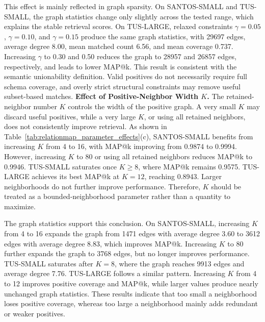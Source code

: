 This effect is mainly reflected in graph sparsity. On SANTOS-SMALL and
TUS-SMALL, the graph statistics change only slightly across the tested range,
which explains the stable retrieval scores. On TUS-LARGE, relaxed constraints
\(\gamma=0.05\), \(\gamma=0.10\), and \(\gamma=0.15\) produce the same graph
statistics, with 29697 edges, average degree 8.00, mean matched count 6.56,
and mean coverage 0.737. Increasing \(\gamma\) to 0.30 and 0.50 reduces the
graph to 28957 and 26857 edges, respectively, and leads to lower MAP@k. This
result is consistent with the semantic unionability definition. Valid
positives do not necessarily require full schema coverage, and overly strict
structural constraints may remove useful subset-based matches.
\textbf{Effect of Positive-Neighbor Width \(K\). }The retained-neighbor number \(K\) controls the width of the positive graph. A
very small \(K\) may discard useful positives, while a very large \(K\), or
using all retained neighbors, does not consistently improve retrieval. As
shown in Table~\ref{tab:relationmap_parameter_effects}(c), SANTOS-SMALL benefits from
increasing \(K\) from 4 to 16, with MAP@k improving from 0.9874 to 0.9994.
However, increasing \(K\) to 80 or using all retained neighbors reduces MAP@k
to 0.9946. TUS-SMALL saturates once \(K\geq 8\), where MAP@k remains 0.9575.
TUS-LARGE achieves its best MAP@k at \(K=12\), reaching 0.8943. Larger
neighborhoods do not further improve performance. Therefore, \(K\) should be
treated as a bounded-neighborhood parameter rather than a quantity to maximize.

The graph statistics support this conclusion. On SANTOS-SMALL, increasing
\(K\) from 4 to 16 expands the graph from 1471 edges with average degree 3.60
to 3612 edges with average degree 8.83, which improves MAP@k. Increasing
\(K\) to 80 further expands the graph to 3768 edges, but no longer improves
performance. TUS-SMALL saturates after \(K=8\), where the graph reaches 9913
edges and average degree 7.76. TUS-LARGE follows a similar pattern. Increasing
\(K\) from 4 to 12 improves positive coverage and MAP@k, while larger values
produce nearly unchanged graph statistics. These results indicate that too
small a neighborhood loses positive coverage, whereas too large a neighborhood
mainly adds redundant or weaker positives.




